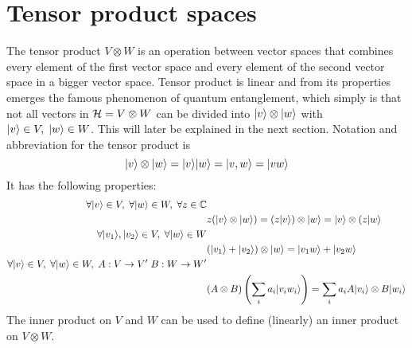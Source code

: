	\section{Tensor product spaces}
	The tensor product $V\otimes W$ is an operation between vector spaces that combines every element of the first vector space and every element of the second vector space in a bigger vector space. Tensor product is linear and from its properties emerges the famous phenomenon of quantum entanglement, which simply is that not all vectors in $\mathcal{H} = V\otimes W$ can be divided into $|v \rangle\otimes|w \rangle$ with $|v \rangle\in V,\; |w \rangle\in W$. This will later be explained in the next section.
	Notation and abbreviation for the tensor product is 
	$$ |v \rangle\otimes|w \rangle = |v \rangle|w \rangle = |v,w \rangle = |vw \rangle$$
	It has the following properties:
	\begin{align*}
		 \forall|v \rangle\in V ,\; \forall|w \rangle\in W, \; \forall z\in \mathbb{C}&\\
					&z(|v \rangle\otimes|w \rangle) = (z|v \rangle)\otimes|w \rangle = |v \rangle\otimes(z|w \rangle \\
		\forall|v_1 \rangle,|v_2 \rangle\in V ,\; \forall|w \rangle\in W	&\\
					 &(|v_1 \rangle + |v_2 \rangle)\otimes|w \rangle = |v_1w \rangle + |v_2w \rangle \\
		\forall|v \rangle\in V ,\; \forall|w \rangle\in W, \; A:V\rightarrow V' \; B:W\rightarrow W'&\\
					&(A\otimes B) \left(\sum_i a_i |v_i w_i \rangle \right) = \sum_i a_i A|v_i \rangle\otimes B|w_i \rangle 
	\end{align*}
	The inner product on $V$ and $W$ can be used to define (linearly) an inner product on $V\otimes W$.	
	
	

